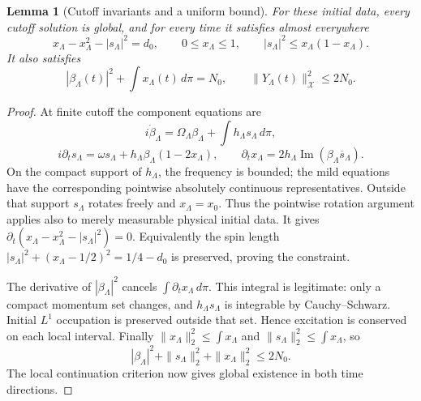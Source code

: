 \documentclass[11pt]{article}
\newtheorem{lemma}[theorem]{Lemma}
\theoremstyle{remark}
\begin{document}
\begin{lemma}[Cutoff invariants and a uniform bound]
\label{lem:v20v66-cutoff}
For these initial data, every cutoff solution is global,
and for every time it satisfies almost everywhere
\[
 x_\Lambda-x_\Lambda^2-|s_\Lambda|^2=d_0,\qquad
 0\leq x_\Lambda\leq1,\qquad
 |s_\Lambda|^2\leq x_\Lambda(1-x_\Lambda).
\]
It also satisfies
\[
 |\beta_\Lambda(t)|^2+\int x_\Lambda(t)\,d\pi=N_0,
 \qquad
 \|Y_\Lambda(t)\|_{\mathcal X}^2\leq2N_0 .
\]
\end{lemma}
\begin{proof}
At finite cutoff the component equations are
\[
 i\dot\beta_\Lambda=\Omega_\Lambda\beta_\Lambda+
                                  \int h_\Lambda s_\Lambda\,d\pi,
\]
\[
 i\partial_t s_\Lambda=\omega s_\Lambda+
                           h_\Lambda\beta_\Lambda(1-2x_\Lambda),
 \qquad
 \partial_t x_\Lambda=
                     2h_\Lambda\operatorname{Im}(\beta_\Lambda\overline s_\Lambda).
\]
On the compact support of \(h_\Lambda\), the frequency
is bounded; the mild equations have the corresponding
pointwise absolutely continuous representatives.
Outside that support \(s_\Lambda\) rotates freely and
\(x_\Lambda=x_0\).  Thus the pointwise rotation argument
applies also to merely measurable physical initial data.
It gives
\(\partial_t(x_\Lambda-x_\Lambda^2-|s_\Lambda|^2)=0\).
Equivalently the spin length
\(|s_\Lambda|^2+(x_\Lambda-1/2)^2=1/4-d_0\)
is preserved, proving the constraint.

The derivative of \(|\beta_\Lambda|^2\) cancels
\(\int\partial_t x_\Lambda\,d\pi\).
This integral is legitimate: only a compact momentum
set changes, and \(h_\Lambda s_\Lambda\) is integrable
by Cauchy--Schwarz.  Initial \(L^1\) occupation is
preserved outside that set.  Hence excitation is
conserved on each local interval.
Finally \(\|x_\Lambda\|_2^2\leq\int x_\Lambda\) and
\(\|s_\Lambda\|_2^2\leq\int x_\Lambda\), so
\[
 |\beta_\Lambda|^2+\|s_\Lambda\|_2^2+\|x_\Lambda\|_2^2
              \leq2N_0.
\]
The local continuation criterion now gives global
existence in both time directions.
\end{proof}
\end{document}
